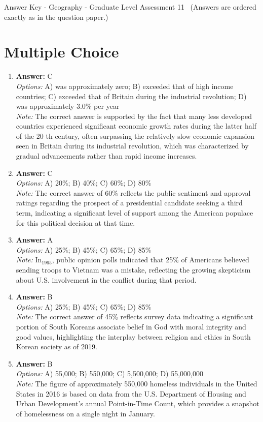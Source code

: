 \documentclass[12pt]{article}
\begin{document}
\begin{center}
Answer Key - Geography - Graduate Level Assessment 11 \
\small (Answers are ordered exactly as in the question paper.)
\end{center}

\section*{Multiple Choice}
\begin{enumerate}[label=\arabic*.]
\item \textbf{Answer:} C
\\ \textit{Options:} A) was approximately zero; B) exceeded that of high income countries; C) exceeded that of Britain during the industrial revolution; D) was approximately 3.0\% per year
\\ \textit{Note:} The correct answer is supported by the fact that many less developed countries experienced significant economic growth rates during the latter half of the 20 th century, often surpassing the relatively slow economic expansion seen in Britain during its industrial revolution, which was characterized by gradual advancements rather than rapid income increases.
\item \textbf{Answer:} C
\\ \textit{Options:} A) 20\%; B) 40\%; C) 60\%; D) 80\%
\\ \textit{Note:} The correct answer of 60\% reflects the public sentiment and approval ratings regarding the prospect of a presidential candidate seeking a third term, indicating a significant level of support among the American populace for this political decision at that time.
\item \textbf{Answer:} A
\\ \textit{Options:} A) 25\%; B) 45\%; C) 65\%; D) 85\%
\\ \textit{Note:} In$_{1965}$, public opinion polls indicated that 25\% of Americans believed sending troops to Vietnam was a mistake, reflecting the growing skepticism about U.S. involvement in the conflict during that period.
\item \textbf{Answer:} B
\\ \textit{Options:} A) 25\%; B) 45\%; C) 65\%; D) 85\%
\\ \textit{Note:} The correct answer of 45\% reflects survey data indicating a significant portion of South Koreans associate belief in God with moral integrity and good values, highlighting the interplay between religion and ethics in South Korean society as of 2019.
\item \textbf{Answer:} B
\\ \textit{Options:} A) 55,000; B) 550,000; C) 5,500,000; D) 55,000,000
\\ \textit{Note:} The figure of approximately 550,000 homeless individuals in the United States in 2016 is based on data from the U.S. Department of Housing and Urban Development's annual Point-in-Time Count, which provides a snapshot of homelessness on a single night in January.
\end{enumerate}
\end{document}
